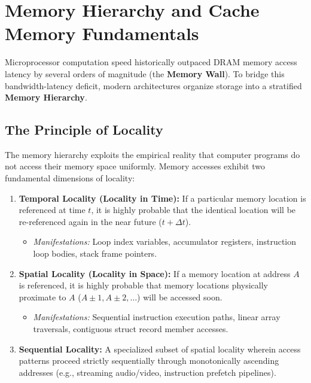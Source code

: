 \section{Memory Hierarchy and Cache Memory Fundamentals}
\label{sec:memory_hierarchy}

Microprocessor computation speed historically outpaced DRAM memory access latency by several orders of magnitude (the \textbf{Memory Wall}). To bridge this bandwidth-latency deficit, modern architectures organize storage into a stratified \textbf{Memory Hierarchy}.

\subsection{The Principle of Locality}
The memory hierarchy exploits the empirical reality that computer programs do not access their memory space uniformly. Memory accesses exhibit two fundamental dimensions of locality:
\begin{enumerate}[label=\bfseries\arabic*.]
    \item \textbf{Temporal Locality (Locality in Time):} If a particular memory location is referenced at time $t$, it is highly probable that the identical location will be re-referenced again in the near future ($t + \Delta t$).
    \begin{itemize}
        \item \textit{Manifestations:} Loop index variables, accumulator registers, instruction loop bodies, stack frame pointers.
    \end{itemize}
    \item \textbf{Spatial Locality (Locality in Space):} If a memory location at address $A$ is referenced, it is highly probable that memory locations physically proximate to $A$ ($A \pm 1, A \pm 2, \dots$) will be accessed soon.
    \begin{itemize}
        \item \textit{Manifestations:} Sequential instruction execution paths, linear array traversals, contiguous struct record member accesses.
    \end{itemize}
    \item \textbf{Sequential Locality:} A specialized subset of spatial locality wherein access patterns proceed strictly sequentially through monotonically ascending addresses (e.g., streaming audio/video, instruction prefetch pipelines).
\end{enumerate}

